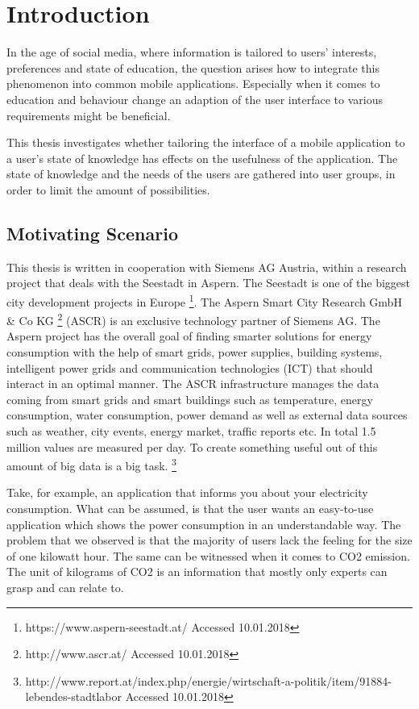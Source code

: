 \chapter{Introduction}

In the age of social media, where information is tailored to users' interests, preferences and state of education, the question arises how to integrate this phenomenon into common mobile applications. Especially when it comes to education and behaviour change an adaption of the user interface to various requirements might be beneficial.

This thesis investigates whether tailoring the interface of a mobile application to a user's state of knowledge has effects on the usefulness of the application. The state of knowledge and the needs of the users are gathered into user groups, in order to limit the amount of possibilities.


\section{Motivating Scenario}

This thesis is written in cooperation with Siemens AG Austria, within a research project that deals with the Seestadt in Aspern. The Seestadt is one of the biggest city development projects in Europe \footnote{https://www.aspern-seestadt.at/ Accessed 10.01.2018}. The Aspern Smart City Research GmbH \& Co KG \footnote{http://www.ascr.at/ Accessed 10.01.2018} (ASCR) is an exclusive technology partner of Siemens AG. The Aspern project has the overall goal of finding smarter solutions for energy consumption with the help of smart grids, power supplies, building systems, intelligent power grids and communication technologies (ICT) that should interact in an optimal manner. The ASCR infrastructure manages the data coming from smart grids and smart buildings such as temperature, energy consumption, water consumption, power demand as well as external data sources such as weather, city events, energy market, traffic reports etc. \cite{parreira2015role} In total 1.5 million values are measured per day. To create something useful out of this amount of big data is a big task. \footnote{http://www.report.at/index.php/energie/wirtschaft-a-politik/item/91884-lebendes-stadtlabor Accessed 10.01.2018}

Take, for example, an application that informs you about your electricity consumption. What can be assumed, is that the user wants an easy-to-use application which shows the power consumption in an understandable way. The problem that we observed is that the majority of users lack the feeling for the size of one kilowatt hour. The same can be witnessed when it comes to CO2 emission. The unit of kilograms of CO2 is an information that mostly only experts can grasp and can relate to.


